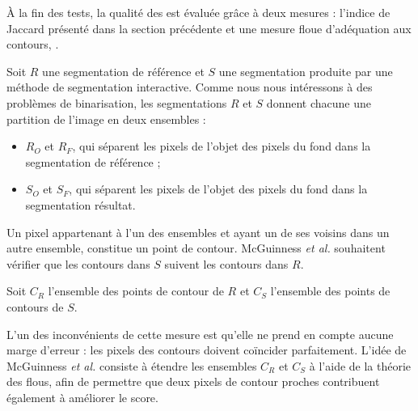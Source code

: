 À la fin des tests, la qualité des  est évaluée grâce à deux mesures : l'indice de Jaccard présenté dans la section précédente et une mesure floue d'adéquation aux contours, .

Soit $R$  une segmentation de référence et $S$  une segmentation produite par une méthode de segmentation interactive. Comme nous nous intéressons à des problèmes de binarisation, les segmentations $R$ et $S$ donnent chacune une partition de l'image en deux ensembles :
\begin{itemize}
\item $R_{O}$ et $R_{F}$, qui séparent les pixels de l'objet des pixels du fond dans la segmentation de référence ;
\item $S_{O}$ et $S_{F}$, qui séparent les pixels de l'objet des pixels du fond dans la segmentation résultat.
\end{itemize}

Un pixel appartenant à l'un des ensembles et ayant un de ses voisins dans un autre ensemble, constitue un point de contour. McGuinness \textit{et al.} souhaitent vérifier que les contours dans $S$ suivent les contours dans $R$.

Soit $C_{R}$  l'ensemble des points de contour de $R$ et $C_{S}$ l'ensemble des points de contours de $S$. 

L'un des inconvénients de cette mesure est qu'elle ne prend en compte aucune marge d'erreur :  les pixels des contours doivent coïncider parfaitement. L'idée de McGuinness \textit{et al.} consiste à étendre les ensembles $C_{R}$ et $C_{S}$ à l'aide de la théorie des  flous, afin de permettre que deux pixels de contour proches  contribuent également à améliorer le score. 

